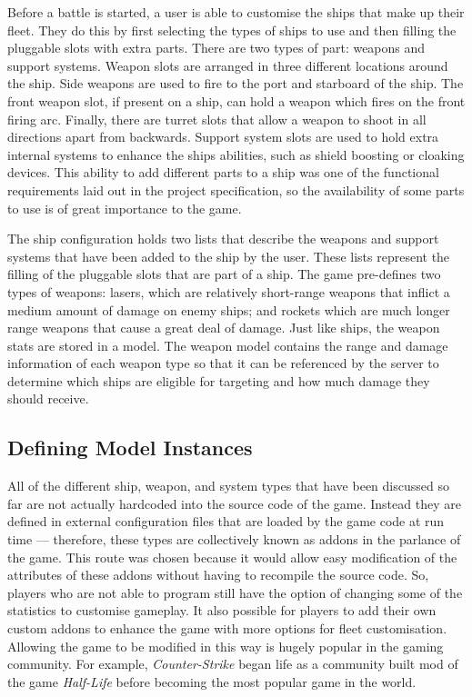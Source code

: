 Before a battle is started, a user is able to customise the ships that make up their fleet. They do this by first selecting the types of ships to use and then filling the pluggable slots with extra parts. There are two types of part: weapons and support systems. Weapon slots are arranged in three different locations around the ship. Side weapons are used to fire to the port and starboard of the ship. The front weapon slot, if present on a ship, can hold a weapon which fires on the front firing arc. Finally, there are turret slots that allow a weapon to shoot in all directions apart from backwards. Support system slots are used to hold extra internal systems to enhance the ships abilities, such as shield boosting or cloaking devices. This ability to add different parts to a ship was one of the functional requirements laid out in the project specification, so the availability of some parts to use is of great importance to the game.

The ship configuration holds two lists that describe the weapons and support systems that have been added to the ship by the user. These lists represent the filling of the pluggable slots that are part of a ship. The game pre-defines two types of weapons: lasers, which are relatively short-range weapons that inflict a medium amount of damage on enemy ships; and rockets which are much longer range weapons that cause a great deal of damage. Just like ships, the weapon stats are stored in a model. The weapon model contains the range and damage information of each weapon type so that it can be referenced by the server to determine which ships are eligible for targeting and how much damage they should receive.

\subsection{Defining Model Instances}

All of the different ship, weapon, and system types that have been discussed so far are not actually hardcoded into the source code of the game. Instead they are defined in external configuration files that are loaded by the game code at run time --- therefore, these types are collectively known as addons in the parlance of the game. This route was chosen because it would allow easy modification of the attributes of these addons without having to recompile the source code. So, players who are not able to program still have the option of changing some of the statistics to customise gameplay. It also possible for players to add their own custom addons to enhance the game with more options for fleet customisation. Allowing the game to be modified in this way is hugely popular in the gaming community. For example, \emph{Counter-Strike} began life as a community built mod of the game \emph{Half-Life} before becoming the most popular game in the world.\cite{lambdageneration2012}

